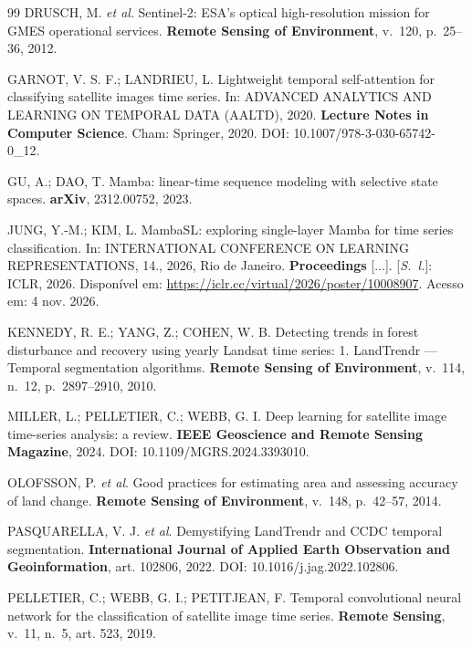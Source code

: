 \documentclass[conference]{IEEEtran}
\begin{document}
\begin{thebibliography}{99}
 DRUSCH, M. \textit{et al}. Sentinel-2: ESA's optical high-resolution mission for GMES operational services. \textbf{Remote Sensing of Environment}, v.~120, p.~25--36, 2012.

 GARNOT, V. S. F.; LANDRIEU, L. Lightweight temporal self-attention for classifying satellite images time series. In: ADVANCED ANALYTICS AND LEARNING ON TEMPORAL DATA (AALTD), 2020. \textbf{Lecture Notes in Computer Science}. Cham: Springer, 2020. DOI: 10.1007/978-3-030-65742-0\_12.

 GU, A.; DAO, T. Mamba: linear-time sequence modeling with selective state spaces. \textbf{arXiv}, 2312.00752, 2023.

 JUNG, Y.-M.; KIM, L. MambaSL: exploring single-layer Mamba for time series classification. In: INTERNATIONAL CONFERENCE ON LEARNING REPRESENTATIONS, 14., 2026, Rio de Janeiro. \textbf{Proceedings} [...]. [\textit{S.~l.}]: ICLR, 2026. Disponível em: \url{https://iclr.cc/virtual/2026/poster/10008907}. Acesso em: 4 nov. 2026.

 KENNEDY, R. E.; YANG, Z.; COHEN, W. B. Detecting trends in forest disturbance and recovery using yearly Landsat time series: 1. LandTrendr --- Temporal segmentation algorithms. \textbf{Remote Sensing of Environment}, v.~114, n.~12, p.~2897--2910, 2010.

 MILLER, L.; PELLETIER, C.; WEBB, G. I. Deep learning for satellite image time-series analysis: a review. \textbf{IEEE Geoscience and Remote Sensing Magazine}, 2024. DOI: 10.1109/MGRS.2024.3393010.

 OLOFSSON, P. \textit{et al}. Good practices for estimating area and assessing accuracy of land change. \textbf{Remote Sensing of Environment}, v.~148, p.~42--57, 2014.

 PASQUARELLA, V. J. \textit{et al}. Demystifying LandTrendr and CCDC temporal segmentation. \textbf{International Journal of Applied Earth Observation and Geoinformation}, art. 102806, 2022. DOI: 10.1016/j.jag.2022.102806.

 PELLETIER, C.; WEBB, G. I.; PETITJEAN, F. Temporal convolutional neural network for the classification of satellite image time series. \textbf{Remote Sensing}, v.~11, n.~5, art. 523, 2019.


\end{thebibliography}
\end{document}
